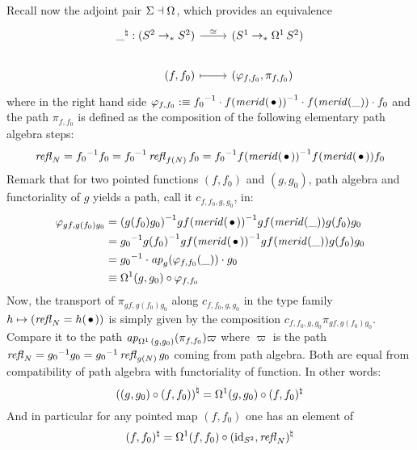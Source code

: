 \documentclass[english,a4]{article}
\newcommand{\Sp}{{S^2}}%
\newcommand{\mrd}{\mathit{merid}}%
\newcommand{\susp}[1]{\Sigma{#1}}%
\newcommand{\ptdto}{\to_\ast}%
\def\blank{\_}%
\begin{document}
Recall now the adjoint pair $\susp{}\dashv\loopspace{}$, which
provides an equivalence
\begin{equation}
  \label{eq:24}
  \begin{tikzcd}[%
    /tikz/column 1/.append style={anchor=base east},%
    /tikz/column 2/.append style={anchor=base west}]
    \blank^\natural : (\Sp \ptdto \Sp) \rar["\weq"] & (\Sc \ptdto
    \loopspace 1 \Sp)
    \\
    (f,f_0) \rar[mapsto] & (\varphi_{f,f_0}, \pi_{f,f_0})
  \end{tikzcd}
\end{equation}
where in the right hand side
$\varphi_{f,f_0} \defequi\inv{f_0}\cdot \inv{f(\mrd(\base))}\cdot
f(\mrd(\blank))\cdot f_0$ and the path $\pi_{f,f_0}$ is defined as the
composition of the following elementary path algebra steps:
\begin{equation}
  \label{eq:16}
  \refl N = \inv{f_0}f_0 = \inv{f_0}\refl {f(N)} f_0 =  \inv{f_0}\inv{f(\mrd(\base))}f(\mrd(\base)) f_0
\end{equation}
Remark that for two pointed functions $(f,f_0)$ and $(g,g_0)$, path
algebra and functoriality of $g$ yields a path, call it
$c_{f,f_0,g,g_0}$, in:
\begin{equation}
  \begin{aligned}
    \varphi_{gf,g(f_0)g_0} %
    &= \inv{(g(f_0)g_0)}\inv{gf(\mrd(\base))} gf(\mrd(\blank))
    g(f_0)g_0
    \\
    &= \inv{g_0}\inv{g(f_0)}\inv{gf(\mrd(\base))} gf(\mrd(\blank))
    g(f_0)g_0
    \\
    &= \inv{g_0} \cdot \ap g (\varphi_{f,f_0}(\blank)) \cdot g_0
    \\
    &\jdeq \loopspace 1 (g,g_0) \circ \varphi_{f,f_0}
  \end{aligned}\label{eq:26}
\end{equation}
Now, the transport of $\pi_{gf,g(f_0)g_0}$ along $c_{f,f_0,g,g_0}$ in
the type family $h\mapsto (\refl N = h(\base))$ is simply given by the
composition $c_{f,f_0,g,g_0}\pi_{gf,g(f_0)g_0}$. Compare it to the
path $\mathop{{\it ap}_{\mathop{\Omega^{1}}{(g,g_0)}}}(\pi_{f,f_0})\varpi$ where $\varpi$ is
the path $\mathop{{\mathit{refl}}_{N}} = {g_0}^{-1}g_0 = {g_0}^{-1}\mathop{{\mathit{refl}}_{g(N)}}g_0$ coming
from path algebra. Both are equal from compatibility of path algebra
with functoriality of function. In other words:
\begin{equation}
  \label{eq:27}
  {\left((g,g_0)\circ (f,f_0)\right)}^\natural = \mathop{\Omega^{1}} (g,g_0) \circ (f,f_0)^\natural 
\end{equation}
And in particular for any pointed map $(f,f_0)$ one has an element of
\begin{displaymath}
  (f,f_0)^\natural = \loopspace 1 (f,f_0) \circ
  (\id_{\Sp},\refl N)^\natural
\end{displaymath}
\end{document}
